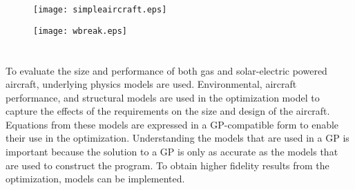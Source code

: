 \begin{figure}[H]
	\begin{center}
	\texttt{[image: simpleaircraft.eps]}
    \caption{\textbf{}}
	\label{f:simpleaircraft}
	\end{center}
\end{figure}

\begin{figure}[H]
	\begin{center}
	\texttt{[image: wbreak.eps]}
   \caption{\textbf{}}
	\label{f:wbreak}
	\end{center}
\end{figure}


\section{}

\DIFaddend To evaluate the size and performance of both gas and solar-electric powered aircraft, underlying physics models are used.  
Environmental, aircraft performance, and structural models are used in the optimization model to capture the effects of the requirements on the size and design of the aircraft.
Equations from these models are expressed in a GP-compatible form to enable their use in the optimization. 
Understanding the models that are used in a GP is important because the solution to a GP is only as accurate as the models that are used to construct the program.  
To obtain higher fidelity results from the optimization, \DIFdelbegin {}\DIFdelend \DIFaddbegin {}\DIFaddend models can be implemented. 

